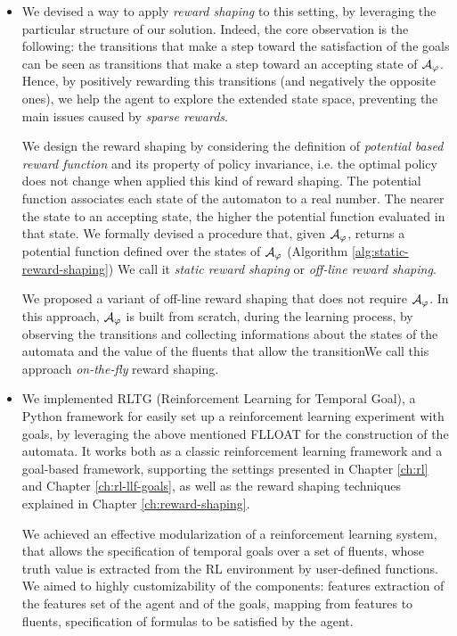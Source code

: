 \begin{itemize}
	\item We devised a way to apply \emph{reward shaping} to this setting, by leveraging the particular structure of our solution. Indeed, the core observation is the following: the transitions that make a step toward the satisfaction of the \LLf goals can be seen as transitions that make a step toward an accepting state of $\mathcal{A}_\varphi$. Hence, by positively rewarding this transitions (and negatively the opposite ones), we help the agent to explore the extended state space, preventing the main issues caused by \emph{sparse rewards}.
	
	We design the reward shaping by considering the definition of \emph{potential based reward function} \citep{Ng:1999:PIU:645528.657613} and its property of policy invariance, i.e. the optimal policy does not change when applied this kind of reward shaping. The potential function associates each state of the automaton to a real number. The nearer the state to an accepting state, the higher the potential function evaluated in that state. We formally devised a procedure that, given $\mathcal{A}_\varphi$, returns a potential function defined over the states of $\mathcal{A}_\varphi$ (Algorithm \ref{alg:static-reward-shaping}) We call it \emph{static reward shaping} or \emph{off-line reward shaping}.
	
	We proposed a variant of off-line reward shaping that does not require $\mathcal{A}_\varphi$. In this approach, $\mathcal{A}_\varphi$ is built from scratch, during the learning process, by observing the transitions and collecting informations about the states of the automata and the value of the fluents that allow the transitionWe call this approach \emph{on-the-fly} reward shaping.
	
	\item We implemented RLTG (Reinforcement Learning for Temporal Goal), a Python framework for easily set up a reinforcement learning experiment with \LLf goals, by leveraging the above mentioned FLLOAT for the construction of the automata. It works both as a classic reinforcement learning framework and a \LLf goal-based framework, supporting the settings presented in Chapter \ref{ch:rl} and Chapter \ref{ch:rl-llf-goals}, as well as the reward shaping techniques explained in Chapter \ref{ch:reward-shaping}.
	
	We achieved an effective modularization of a reinforcement learning system, that allows the specification of temporal goals over a set of fluents, whose truth value is extracted from the RL environment by user-defined functions. We aimed to highly customizability of the components: features extraction of the features set of the agent and of the \LLf goals, mapping from features to fluents, specification of \LLf formulas to be satisfied by the agent. 
	

\end{itemize}

